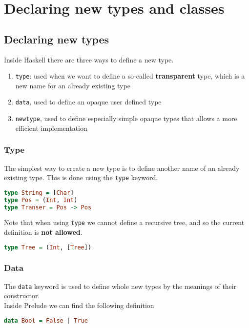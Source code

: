 \newpage
\chapter{Declaring new types and classes}
\section{Declaring new types}
Inside Haskell there are three ways to define a new type.

\begin{enumerate}
	\item \texttt{type}: used when we want to define a so-called \textbf{transparent} type, which is a new name for an already existing type
	\item \texttt{data}, used to define an opaque user defined type
	\item \texttt{newtype}, used to define especially simple opaque types that allows a more efficient implementation 
\end{enumerate}

\subsection{Type}
The simplest way to create a new type is to define another name of an already existing type. This is done using the \texttt{type} keyword.

\begin{lstlisting}[language=haskell]
type String = [Char] 
type Pos = (Int, Int)
type Transer = Pos -> Pos
\end{lstlisting}

Note that when using \texttt{type} we cannot define a recursive tree, and so the current definition is \textbf{not allowed}.

\begin{lstlisting}[language=haskell]
type Tree = (Int, [Tree])
\end{lstlisting}

\subsection{Data}
The \texttt{data} keyword is used to define whole new types by the meanings of their constructor. \\

Inside Prelude we can find the following definition

\begin{lstlisting}[language=haskell]
data Bool = False | True
\end{lstlisting}

